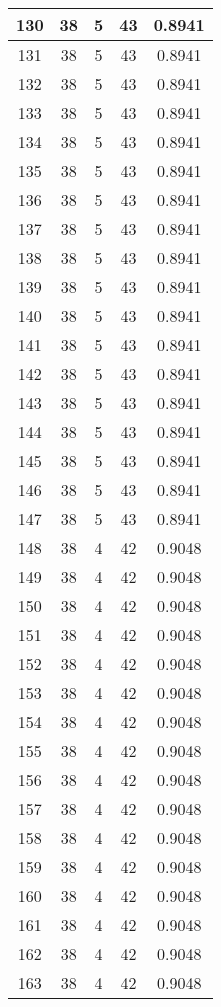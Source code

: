 \documentclass[letterpaper, 12pt]{article}
\begin{document}
\begin{longtable}{|c|c|c|c|c|}
\hline
130 & 38 & 5 & 43 & 0.8941 \\
\hline
131 & 38 & 5 & 43 & 0.8941 \\
\hline
132 & 38 & 5 & 43 & 0.8941 \\
\hline
133 & 38 & 5 & 43 & 0.8941 \\
\hline
134 & 38 & 5 & 43 & 0.8941 \\
\hline
135 & 38 & 5 & 43 & 0.8941 \\
\hline
136 & 38 & 5 & 43 & 0.8941 \\
\hline
137 & 38 & 5 & 43 & 0.8941 \\
\hline
138 & 38 & 5 & 43 & 0.8941 \\
\hline
139 & 38 & 5 & 43 & 0.8941 \\
\hline
140 & 38 & 5 & 43 & 0.8941 \\
\hline
141 & 38 & 5 & 43 & 0.8941 \\
\hline
142 & 38 & 5 & 43 & 0.8941 \\
\hline
143 & 38 & 5 & 43 & 0.8941 \\
\hline
144 & 38 & 5 & 43 & 0.8941 \\
\hline
145 & 38 & 5 & 43 & 0.8941 \\
\hline
146 & 38 & 5 & 43 & 0.8941 \\
\hline
147 & 38 & 5 & 43 & 0.8941 \\
\hline
148 & 38 & 4 & 42 & 0.9048 \\
\hline
149 & 38 & 4 & 42 & 0.9048 \\
\hline
150 & 38 & 4 & 42 & 0.9048 \\
\hline
151 & 38 & 4 & 42 & 0.9048 \\
\hline
152 & 38 & 4 & 42 & 0.9048 \\
\hline
153 & 38 & 4 & 42 & 0.9048 \\
\hline
154 & 38 & 4 & 42 & 0.9048 \\
\hline
155 & 38 & 4 & 42 & 0.9048 \\
\hline
156 & 38 & 4 & 42 & 0.9048 \\
\hline
157 & 38 & 4 & 42 & 0.9048 \\
\hline
158 & 38 & 4 & 42 & 0.9048 \\
\hline
159 & 38 & 4 & 42 & 0.9048 \\
\hline
160 & 38 & 4 & 42 & 0.9048 \\
\hline
161 & 38 & 4 & 42 & 0.9048 \\
\hline
162 & 38 & 4 & 42 & 0.9048 \\
\hline
163 & 38 & 4 & 42 & 0.9048 \\

\end{longtable}
\end{document}
